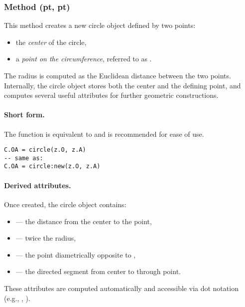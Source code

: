 \subsubsection{Method (pt, pt)}
\label{ssub:method_circle_new}

This method creates a new circle object defined by two points:
\begin{itemize}
\item the \emph{center} of the circle,
\item a \emph{point on the circumference}, referred to as .
\end{itemize}
The radius is computed as the Euclidean distance between the two points. Internally, the circle object stores both the center and the defining point, and computes several useful attributes for further geometric constructions.
\vspace{1em}
\paragraph{Short form.}
The function  is equivalent to  and is recommended for ease of use.
\begin{mybox}
\begin{verbatim}
C.OA = circle(z.O, z.A)
-- same as:
C.OA = circle:new(z.O, z.A)
\end{verbatim}
\end{mybox}
\paragraph{Derived attributes.}
Once created, the circle object contains:
\begin{itemize}
\item {} — the distance from the center to the point,
\item {} — twice the radius,
\item {} — the point diametrically opposite to ,
\item {} — the directed segment from center to through point.
\end{itemize}
These attributes are computed automatically and accessible via dot notation (e.g., , ).


\vspace{1em}

\begin{tkzexample}[latex=.5\textwidth]
\begin{center}
  \end{center}
\end{tkzexample}


